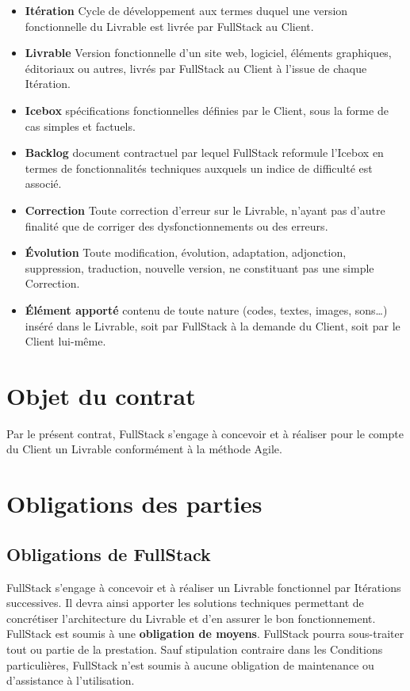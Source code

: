 \documentclass[11pt]{article}
\begin{document}
\begin{itemize}
  \item \textbf{Itération} Cycle de développement aux termes duquel une version fonctionnelle du Livrable est livrée par FullStack au Client.
  \item \textbf{Livrable} Version fonctionnelle d’un site web, logiciel, éléments graphiques, éditoriaux ou autres, livrés par FullStack au Client à l’issue de chaque Itération.
  \item \textbf{Icebox} spécifications fonctionnelles définies par le Client, sous la forme de cas simples et factuels.
  \item \textbf{Backlog} document contractuel par lequel FullStack reformule l’Icebox en termes de fonctionnalités techniques auxquels un indice de difficulté est associé.
  \item \textbf{Correction} Toute correction d’erreur sur le Livrable, n’ayant pas d’autre finalité que de corriger des dysfonctionnements ou des erreurs.
  \item \textbf{Évolution} Toute modification, évolution, adaptation, adjonction, suppression, traduction, nouvelle version, ne constituant pas une simple Correction.
  \item \textbf{Élément apporté} contenu de toute nature (codes, textes, images, sons…) inséré dans le Livrable, soit par FullStack à la demande du Client, soit par le Client lui-même.
\end{itemize}


\section{Objet du contrat}

Par le présent contrat, FullStack s’engage à concevoir et à réaliser pour le compte du Client un Livrable conformément à la méthode Agile.

\section{Obligations des parties}

\subsection{Obligations de FullStack}

FullStack s’engage à concevoir et à réaliser un Livrable fonctionnel par Itérations successives. Il devra ainsi apporter les solutions techniques permettant de concrétiser l’architecture du Livrable et d’en assurer le bon fonctionnement. FullStack est soumis à une \textbf{obligation de moyens}. FullStack pourra sous-traiter tout ou partie de la prestation. Sauf stipulation contraire dans les Conditions particulières, FullStack n’est soumis à aucune obligation de maintenance ou d’assistance à l’utilisation.
\end{document}
